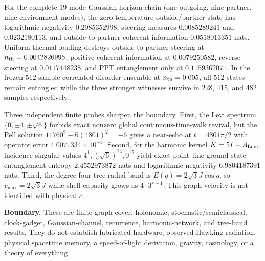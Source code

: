 For the complete $19$-mode Gaussian horizon chain (one outgoing, nine partner, nine environment modes), the zero-temperature outside/partner state has logarithmic negativity $0.2085352998$, steering measures $0.0085289241$ and $0.0232180113$, and outside-to-partner coherent information $0.0518013351$ nats.  Uniform thermal loading destroys outside-to-partner steering at $n_{\rm th}=0.0042826995$, positive coherent information at $0.0079250582$, reverse steering at $0.0117448238$, and PPT entanglement only at $0.1159362071$.  In the frozen $512$-sample correlated-disorder ensemble at $n_{\rm th}=0.005$, all $512$ states remain entangled while the three stronger witnesses survive in $228$, $415$, and $482$ samples respectively.

Three independent finite probes sharpen the boundary.  First, the Levi spectrum $\{0,\pm4,\pm\sqrt6\}$ forbids exact nonzero global continuous-time-walk revival, but the Pell solution $11760^2-6(4801)^2=-6$ gives a near-echo at $t=4801\pi/2$ with operator error $4.0071334\times10^{-4}$.  Second, for the harmonic kernel $K=5I-A_{\rm Levi}$, incidence singular values $4^1,(\sqrt6)^{24},0^{15}$ yield exact point--line ground-state entanglement entropy $2.4552973872$ nats and logarithmic negativity $6.9804187391$ nats.  Third, the degree-four tree radial band is $E(q)=2\sqrt3J\cos q$, so $v_{\max}=2\sqrt3J$ while shell capacity grows as $4\cdot3^{r-1}$.  This graph velocity is not identified with physical $c$.

\textbf{Boundary.}  These are finite graph-cover, holonomic, stochastic/semiclassical, clock-gadget, Gaussian-channel, recurrence, harmonic-network, and tree-band results.  They do not establish fabricated hardware, observed Hawking radiation, physical spacetime memory, a speed-of-light derivation, gravity, cosmology, or a theory of everything.
